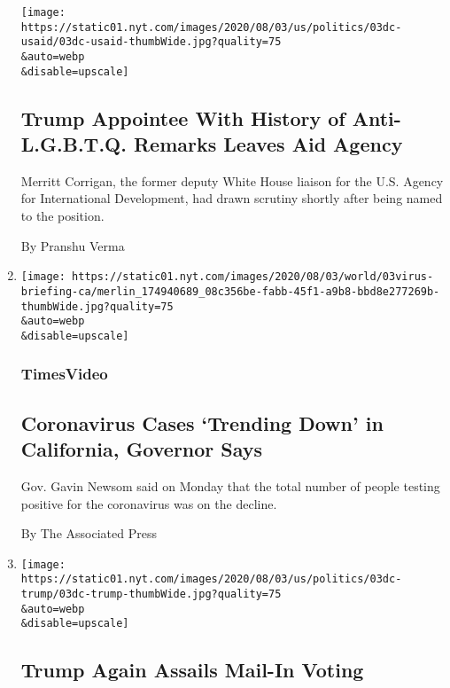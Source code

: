 \begin{enumerate}
  \texttt{[image: https://static01.nyt.com/images/2020/08/03/us/politics/03dc-usaid/03dc-usaid-thumbWide.jpg?quality=75\\\&auto=webp\\\&disable=upscale]}

  \hypertarget{trump-appointee-with-history-of-anti-lgbtq-remarks-leaves-aid-agency}{%
  \subsection{Trump Appointee With History of Anti-L.G.B.T.Q. Remarks
  Leaves Aid
  Agency}\label{trump-appointee-with-history-of-anti-lgbtq-remarks-leaves-aid-agency}}

  Merritt Corrigan, the former deputy White House liaison for the U.S.
  Agency for International Development, had drawn scrutiny shortly after
  being named to the position.

  By Pranshu Verma
\item
  \href{/video/us/100000007271181/california-virus-cases-trend-down.html}{}

  \texttt{[image: https://static01.nyt.com/images/2020/08/03/world/03virus-briefing-ca/merlin\_174940689\_08c356be-fabb-45f1-a9b8-bbd8e277269b-thumbWide.jpg?quality=75\\\&auto=webp\\\&disable=upscale]}

  \hypertarget{timesvideo}{%
  \subsubsection{TimesVideo}\label{timesvideo}}

  \hypertarget{coronavirus-cases-trending-down-in-california-governor-says}{%
  \subsection{Coronavirus Cases `Trending Down' in California, Governor
  Says}\label{coronavirus-cases-trending-down-in-california-governor-says}}

  Gov. Gavin Newsom said on Monday that the total number of people
  testing positive for the coronavirus was on the decline.

  By The Associated Press
\item
  \href{/2020/08/03/us/politics/trump-mail-in-voting.html}{}

  \texttt{[image: https://static01.nyt.com/images/2020/08/03/us/politics/03dc-trump/03dc-trump-thumbWide.jpg?quality=75\\\&auto=webp\\\&disable=upscale]}

  \hypertarget{trump-again-assails-mail-in-voting}{%
  \subsection{Trump Again Assails Mail-In
  Voting}\label{trump-again-assails-mail-in-voting}}


\end{enumerate}
